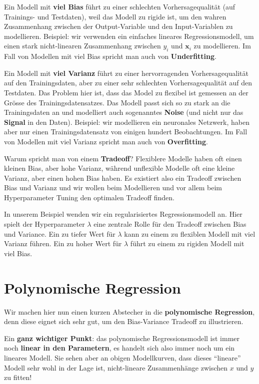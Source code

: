 \documentclass[
]{book}
\begin{document}
Ein Modell mit \textbf{viel Bias} führt zu einer schlechten Vorhersagequalität (auf Trainings- und Testdaten), weil das Modell zu rigide ist, um den wahren Zusammenhang zwischen der Output-Variable und den Input-Variablen zu modellieren. Beispiel: wir verwenden ein einfaches lineares Regressionsmodell, um einen stark nicht-linearen Zusammenhang zwischen \(y_i\) und \(\mathbf{x}_i\) zu modellieren. Im Fall von Modellen mit viel Bias spricht man auch von \textbf{Underfitting}.

Ein Modell mit \textbf{viel Varianz} führt zu einer hervorragenden Vorhersagequalität auf den Trainingsdaten, aber zu einer sehr schlechten Vorhersagequalität auf den Testdaten. Das Problem hier ist, dass das Model zu flexibel ist gemessen an der Grösse des Trainingsdatensatzes. Das Modell passt sich so zu stark an die Trainingsdaten an und modelliert auch sogenanntes \textbf{Noise} (und nicht nur das \textbf{Signal} in den Daten). Beispiel: wir modellieren ein neuronales Netzwerk, haben aber nur einen Trainingsdatensatz von einigen hundert Beobachtungen. Im Fall von Modellen mit viel Varianz spricht man auch von \textbf{Overfitting}.

Warum spricht man von einem \textbf{Tradeoff}? Flexiblere Modelle haben oft einen kleinen Bias, aber hohe Varianz, während unflexible Modelle oft eine kleine Varianz, aber einen hohen Bias haben. Es existiert also ein Tradeoff zwischen Bias und Varianz und wir wollen beim Modellieren und vor allem beim Hyperparameter Tuning den optimalen Tradeoff finden.

In unserem Beispiel wenden wir ein regularisiertes Regressionsmodell an. Hier spielt der Hyperparameter \(\lambda\) eine zentrale Rolle für den Tradeoff zwischen Bias und Variance. Ein zu tiefer Wert für \(\lambda\) kann zu einem zu flexiblen Modell mit viel Varianz führen. Ein zu hoher Wert für \(\lambda\) führt zu einem zu rigiden Modell mit viel Bias.

\hypertarget{polynomische-regression}{%
\section{Polynomische Regression}\label{polynomische-regression}}

Wir machen hier nun einen kurzen Abstecher in die \textbf{polynomische Regression}, denn diese eignet sich sehr gut, um den Bias-Variance Tradeoff zu illustrieren.

Ein \textbf{ganz wichtiger Punkt}: das polynomische Regressionsmodell ist immer noch \textbf{linear in den Parametern}, es handelt sich also immer noch um ein lineares Modell. Sie sehen aber an obigen Modellkurven, dass dieses ``lineare'' Modell sehr wohl in der Lage ist, nicht-lineare Zusammenhänge zwischen \(x\) und \(y\) zu fitten!
\end{document}
